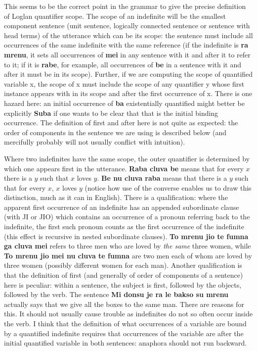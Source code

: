 \documentclass[12pt]{book}
\begin{document}
{This seems to be the correct point in the grammar to give the precise definition of Loglan quantifier scope.  The scope of an indefinite will be the smallest component sentence (unit sentence, logically connected sentence or sentence with head terms) of the utterance which can be its scope:  the sentence must include all occurrences of the same indefinite with the same reference (if the indefinite is {\bf ra mrenu}, it sets all occurrences of {\bf mei} in any sentence with it and after it to refer to it; if it is {\bf rabe}, for example, all occurrences of {\bf be} in a sentence with it and after it must be in its scope).  Further, if we are computing the scope of quantified variable x, the scope of x must include the scope of any quantifier y whose first instance appears with in its scope and after the first occurrence of x.  There is one hazard here:  an initial occurrence of {\bf ba} existentially quantified might better be explicitly {\bf Suba} if one wants to be clear that that is the initial binding occurrence.  The definition of first and after here is not quite as expected:  the order of components in the sentence we are using is described below (and mercifully probably will not usually conflict with intuition).

Where two indefinites have the same scope, the outer quantifier is determined by which one appears first in the utterance.    {\bf Raba cluva be} means that for every $x$ there is a $y$ such that $x$ loves $y$.  {\bf Be nu cluva raba} means that there is a $y$ such that for every $x$, $x$ loves $y$ (notice how use of the converse enables us to draw this distinction, much as it can in English).  There is a qualification:  where the apparent first occurrence of an indefinite has an appended subordinate clause (with JI or JIO) which contains an occurrence of a pronoun referring back to the indefinite, the first such pronoun counts as the first occurrence of the indefinite (this effect is recursive in nested subordinate clauses).  {\bf To mrenu jio te fumna ga cluva mei} refers to three men who are loved by {\em the same\/} three women, while {\bf To mrenu jio mei nu cluva te fumna} are two men each of whom are loved by three women (possibly different women for each man).  Another qualification is that the  definition of first (and generally of order of components of a sentence) here is peculiar:  within a sentence, the subject is first, followed by the objects, followed by the verb.
The sentence {\bf Mi donsu je ra le bakso su mrenu} actually says that we give all the boxes to the same man.  There are reasons for this.  It should not usually cause trouble as indefinites do not so often occur inside the verb.  I think that the definition of what occurrences of a variable are bound by a quantified indefinite requires that occurrences of the variable are after the initial quantified variable in both sentences:  anaphora should not run backward.

}
\end{document}
